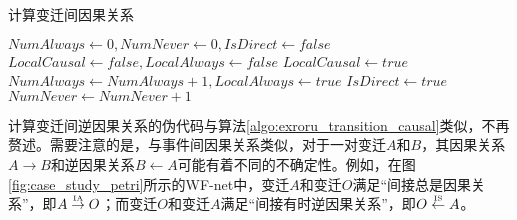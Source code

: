 \begin{algorithm}[htbp]
  \LinesNumbered
  \caption{计算变迁间因果关系}
  \label{algo:exroru_transition_causal}
  $NumAlways\leftarrow 0,NumNever\leftarrow 0,IsDirect\leftarrow false$\;
   {
	$LocalCausal\leftarrow false,LocalAlways\leftarrow false$\;
	 {
  	   {
  	    $LocalCausal\leftarrow true$\;
  	  }
	   {
		$NumAlways\leftarrow NumAlways+1,LocalAlways\leftarrow true$\;
	  }
	   {
	    $IsDirect\leftarrow true$\;
	  }
	}
	 {
	  $NumNever\leftarrow NumNever+1$\;
	}
  }
   {
  }  {
  }  {
  }  {
  } 
\end{algorithm}

计算变迁间逆因果关系的伪代码与算法\ref{algo:exroru_transition_causal}类似，不再赘述。需要注意的是，与事件间因果关系类似，对于一对变迁$A$和$B$，其因果关系$A\rightarrow B$和逆因果关系$B\leftarrow A$可能有着不同的不确定性。例如，在图\ref{fig:case_study_petri}所示的WF-net中，变迁$A$和变迁$O$满足“间接总是因果关系”，即$A\overset{\text{\tiny{IA}}}{\rightarrow}O$；而变迁$O$和变迁$A$满足“间接有时逆因果关系”，即$O\overset{\text{\tiny{IS}}}{\leftarrow}A$。

